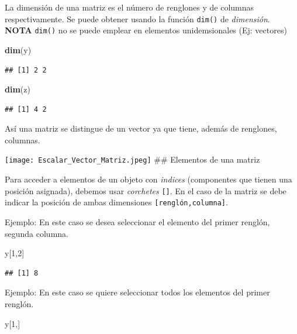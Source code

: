 \documentclass[
]{book}
\newenvironment{Shaded}{\begin{snugshade}}{\end{snugshade}}
\newcommand{\DecValTok}[1]{\textcolor[rgb]{0.00,0.00,0.81}{#1}}
\newcommand{\FunctionTok}[1]{\textcolor[rgb]{0.13,0.29,0.53}{\textbf{#1}}}
\newcommand{\NormalTok}[1]{#1}
\begin{document}
La dimensión de una matriz es el número de renglones y de columnas respectivamente. Se puede obtener usando la función \texttt{dim()} de \emph{dimensión}.
\textbf{NOTA}
\texttt{dim()} no se puede emplear en elementos unidemsionales (Ej: vectores)

\begin{Shaded}
\begin{Highlighting}[]
\FunctionTok{dim}\NormalTok{(y)}
\end{Highlighting}
\end{Shaded}

\begin{verbatim}
## [1] 2 2
\end{verbatim}

\begin{Shaded}
\begin{Highlighting}[]
\FunctionTok{dim}\NormalTok{(z)}
\end{Highlighting}
\end{Shaded}

\begin{verbatim}
## [1] 4 2
\end{verbatim}

Así una matriz se distingue de un vector ya que tiene, además de renglones, columnas.

\texttt{[image: Escalar\_Vector\_Matriz.jpeg]}
\#\# Elementos de una matriz

Para acceder a elementos de un objeto con \emph{indices} (componentes que tienen una posición asignada), debemos usar \emph{corchetes} \texttt{{[}{]}}. En el caso de la matriz se debe indicar la posición de ambas dimensiones \texttt{{[}renglón,columna{]}}.

Ejemplo: En este caso se desea seleccionar el elemento del primer renglón, segunda columna.

\begin{Shaded}
\begin{Highlighting}[]
\NormalTok{y[}\DecValTok{1}\NormalTok{,}\DecValTok{2}\NormalTok{]}
\end{Highlighting}
\end{Shaded}

\begin{verbatim}
## [1] 8
\end{verbatim}

Ejemplo: En este caso se quiere seleccionar todos los elementos del primer renglón.

\begin{Shaded}
\begin{Highlighting}[]
\NormalTok{y[}\DecValTok{1}\NormalTok{,]}
\end{Highlighting}
\end{Shaded}
\end{document}

